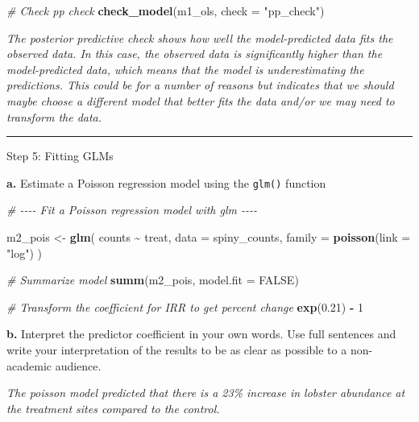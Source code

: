 \documentclass[
]{article}
\newenvironment{Shaded}{\begin{snugshade}}{\end{snugshade}}
\newcommand{\AttributeTok}[1]{\textcolor[rgb]{0.13,0.29,0.53}{#1}}
\newcommand{\CommentTok}[1]{\textcolor[rgb]{0.56,0.35,0.01}{\textit{#1}}}
\newcommand{\ConstantTok}[1]{\textcolor[rgb]{0.56,0.35,0.01}{#1}}
\newcommand{\DecValTok}[1]{\textcolor[rgb]{0.00,0.00,0.81}{#1}}
\newcommand{\FloatTok}[1]{\textcolor[rgb]{0.00,0.00,0.81}{#1}}
\newcommand{\FunctionTok}[1]{\textcolor[rgb]{0.13,0.29,0.53}{\textbf{#1}}}
\newcommand{\NormalTok}[1]{#1}
\newcommand{\OtherTok}[1]{\textcolor[rgb]{0.56,0.35,0.01}{#1}}
\newcommand{\SpecialCharTok}[1]{\textcolor[rgb]{0.81,0.36,0.00}{\textbf{#1}}}
\newcommand{\StringTok}[1]{\textcolor[rgb]{0.31,0.60,0.02}{#1}}
\begin{document}
\begin{Shaded}
\begin{Highlighting}[]
\CommentTok{\# Check pp check}
\FunctionTok{check\_model}\NormalTok{(m1\_ols, }\AttributeTok{check =} \StringTok{"pp\_check"}\NormalTok{)}
\end{Highlighting}
\end{Shaded}

\emph{The posterior predictive check shows how well the model-predicted
data fits the observed data. In this case, the observed data is
significantly higher than the model-predicted data, which means that the
model is underestimating the predictions. This could be for a number of
reasons but indicates that we should maybe choose a different model that
better fits the data and/or we may need to transform the data.}

\begin{center}\rule{0.5\linewidth}{0.5pt}\end{center}

Step 5: Fitting GLMs

\textbf{a.} Estimate a Poisson regression model using the \texttt{glm()}
function

\begin{Shaded}
\begin{Highlighting}[]
\CommentTok{\# {-}{-}{-}{-} Fit a Poisson regression model with glm {-}{-}{-}{-}}

\NormalTok{m2\_pois }\OtherTok{\textless{}{-}} \FunctionTok{glm}\NormalTok{(}
\NormalTok{    counts }\SpecialCharTok{\textasciitilde{}}\NormalTok{ treat,}
    \AttributeTok{data =}\NormalTok{ spiny\_counts,}
    \AttributeTok{family =} \FunctionTok{poisson}\NormalTok{(}\AttributeTok{link =} \StringTok{"log"}\NormalTok{)}
\NormalTok{)}

\CommentTok{\# Summarize model}
\FunctionTok{summ}\NormalTok{(m2\_pois, }\AttributeTok{model.fit =} \ConstantTok{FALSE}\NormalTok{)}

\CommentTok{\# Transform the coefficient for IRR to get percent change}
\FunctionTok{exp}\NormalTok{(}\FloatTok{0.21}\NormalTok{) }\SpecialCharTok{{-}} \DecValTok{1}
\end{Highlighting}
\end{Shaded}

\textbf{b.} Interpret the predictor coefficient in your own words. Use
full sentences and write your interpretation of the results to be as
clear as possible to a non-academic audience.

\emph{The poisson model predicted that there is a 23\% increase in
lobster abundance at the treatment sites compared to the control.}
\end{document}
